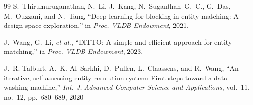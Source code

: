 \documentclass[conference]{IEEEtran}
\begin{document}
\begin{thebibliography}{99}
S.~Thirumuruganathan, N.~Li, J.~Kang, N.~Suganthan~G.~C., G.~Das,
M.~Ouzzani, and N.~Tang,
``Deep learning for blocking in entity matching: A design space
  exploration,''
in \emph{Proc. VLDB Endowment}, 2021.

J.~Wang, G.~Li, \emph{et al.},
``DITTO: A simple and efficient approach for entity matching,''
in \emph{Proc. VLDB Endowment}, 2023.

J.~R. Talburt, A.~K. Al~Sarkhi, D.~Pullen, L.~Claassens, and R.~Wang,
``An iterative, self-assessing entity resolution system: First steps toward
  a data washing machine,''
\emph{Int. J. Advanced Computer Science and Applications}, vol.~11, no.~12,
pp.~680--689, 2020.

\end{thebibliography}
\end{document}
